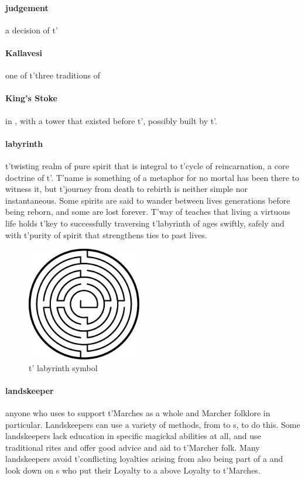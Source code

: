 \paragraph{judgement} a decision of t'\allowbreak {}
\paragraph{Kallavesi} one of t'\allowbreak three traditions of 
\paragraph{King's Stoke}  in , with a tower that existed before t'\allowbreak {}, possibly built by t'\allowbreak {}.
\paragraph{labyrinth}t'twisting realm of pure spirit that is integral to t'\allowbreak cycle of reincarnation, a core doctrine of t'\allowbreak {}. T'name is something of a metaphor for no mortal has been there to witness it, but t'\allowbreak journey from death to rebirth is neither simple nor instantaneous. Some spirits are said to wander between lives generations before being reborn, and some are lost forever. T'way of  teaches that living a virtuous life holds t'\allowbreak key to successfully traversing t'\allowbreak labyrinth of ages swiftly, safely and with t'\allowbreak purity of spirit that strengthens ties to past lives.\begin{figure} \centering \includegraphics[width=5cm]{encyclopedia/Labyrinth} \caption{t' labyrinth symbol}\end{figure}
\paragraph{landskeeper} anyone who uses  to support t'\allowbreak Marches as a whole and Marcher folklore in particular. Landskeepers can use a variety of methods, from  to s, to do this. Some landskeepers lack education in specific magickal abilities at all, and use traditional rites and offer good advice and aid to t'\allowbreak Marcher folk. Many landskeepers avoid t'\allowbreak conflicting loyalties arising from also being part of a  and look down on s who put their Loyalty to a  above Loyalty to t'\allowbreak Marches.
